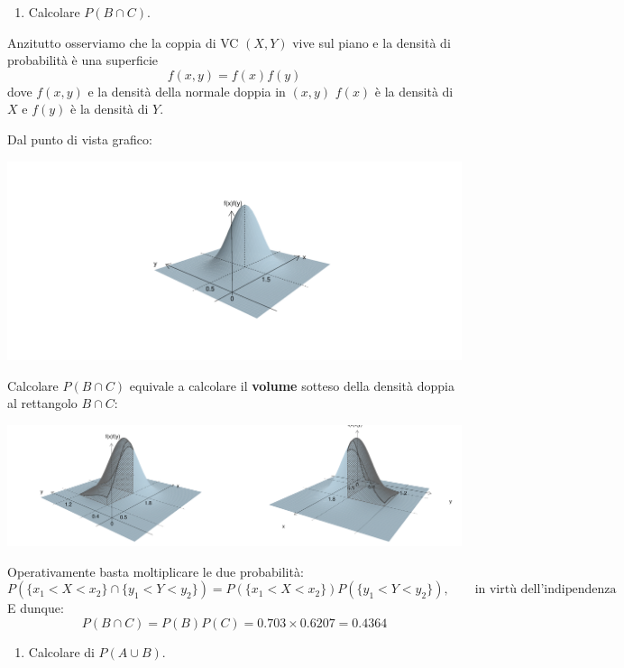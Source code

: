 \documentclass[
  11pt,
]{book}
\providecommand{\tightlist}{%
  \setlength{\itemsep}{0pt}\setlength{\parskip}{0pt}}
\theoremstyle{mytheoremstyle}
\theoremstyle{mydefstyle}
\begin{document}
\begin{enumerate}
\def\labelenumi{\arabic{enumi}.}
\setcounter{enumi}{6}
\tightlist
\item
  Calcolare \(P(B\cap C)\).
\end{enumerate}

Anzitutto osserviamo che la coppia di VC \((X,Y)\) vive sul piano e la densità di probabilità
è una superficie
\[f(x,y)=f(x)f(y)\]
dove \(f(x,y)\) e la densità della normale doppia in \((x,y)\) \(f(x)\) è la densità di \(X\) e \(f(y)\) è la densità di \(Y\).

Dal punto di vista grafico:

\begin{center}\includegraphics{Appunti_di_Statistica_2025_files/figure-latex/07d-Esercizi-Normale-17-1} \end{center}

Calcolare \(P(B\cap C)\) equivale a calcolare il \textbf{volume} sotteso della densità doppia al rettangolo \(B\cap C\):

\begin{center}\includegraphics{Appunti_di_Statistica_2025_files/figure-latex/07d-Esercizi-Normale-18-1} \end{center}

Operativamente basta moltiplicare le due probabilità:
\[P(\{x_1<X<x_2\}\cap\{y_1<Y<y_2\})=P(\{x_1<X<x_2\})P(\{y_1<Y<y_2\}),\qquad \text{in virtù dell'indipendenza}\]
E dunque:
\[P(B\cap C)=P(B)P(C)=0.703\times0.6207=0.4364\]

\begin{enumerate}
\def\labelenumi{\arabic{enumi}.}
\setcounter{enumi}{7}
\tightlist
\item
  Calcolare di \(P(A\cup B)\).
\end{enumerate}
\end{document}
